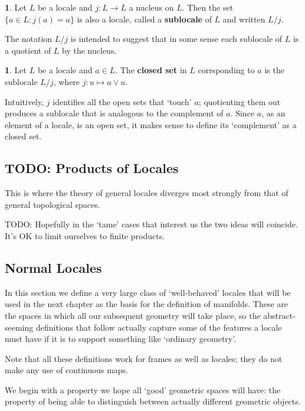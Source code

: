 \documentclass[oneside,english]{amsbook}
\numberwithin{section}{chapter}
\theoremstyle{plain}
\theoremstyle{definition}
\newtheorem{defn}[thm]{\protect\definitionname}
\providecommand{\definitionname}{Definition}
\begin{document}
\begin{defn}
	Let $L$ be a locale and $j:L\to L$ a nucleus on $L$. Then the set $\{a\in L: j(a) = a\}$ is also a locale, called a \textbf{sublocale} of $L$ and written $L/j$.
\end{defn}

The notation $L/j$ is intended to suggest that in some sense each sublocale of $L$ is a quotient of $L$ by the nucleus.

\begin{defn}
	Let $L$ be a locale and $a\in L$. The \textbf{closed set} in $L$ corrsponding to $a$ is the sublocale $L/j$, where $j: u\mapsto a\lor u$. 
\end{defn}

Intuitively, $j$ identifies all the open sets that `touch' $a$; quotienting them out produces a sublocale that is analogous to the complement of $a$. Since $a$, as an element of a locale, is an open set, it makes sense to define its `complement' as a closed set.



\subsection{TODO: Products of Locales}

This is where the theory of general locales diverges most strongly from that of general topological spaces. 

TODO: Hopefully in the `tame' cases that interest us the two ideas will coincide. It's OK to limit ourselves to finite products.


\subsection{Normal Locales}

In this section we define a very large class of `well-behaved' locales that will be used in the next chapter as the basis for the definition of manifolds. These are the spaces in which all our subsequent geometry will take place, so the abstract-seeming definitions that follow actually capture some of the features a locale must have if it is to support something like `ordinary geometry'.

Note that all these definitions work for frames as well as locales; they do not make any use of continuous maps. 

We begin with a property we hope all `good' geometric spaces will have: the property of being able to distinguish between actually different geometric objects. 
\end{document}
